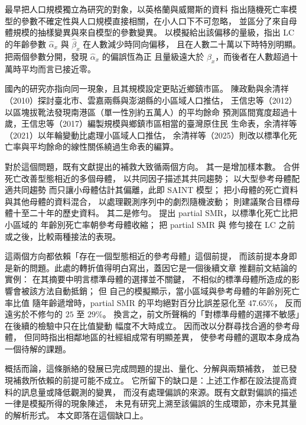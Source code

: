 \documentclass[UTF8, fontset=macnew, a4paper, 12pt]{ctexart}
\begin{document}
\citet{chen2017} 最早把人口規模獨立為研究的對象，以英格蘭與威爾斯的資料
指出隨機死亡率模型的參數不確定性與人口規模直接相關，在小人口下不可忽略，
並區分了來自母體規模的抽樣變異與來自模型的參數變異。
\citet{wang2018} 以模擬給出該偏移的量級，指出 LC 的年齡參數
$\hat\alpha_x$ 與 $\hat\beta_x$ 在人數減少時同向偏移，
且在人數二十萬以下時特別明顯。
\citet[Figure 1]{yue2019} 把兩個參數分開，發現 $\hat\alpha_x$ 的偏誤恆為正
且量級遠大於 $\hat\beta_x$，而後者在人數超過十萬時平均而言已接近零。

國內的研究亦指向同一現象，且其規模設定更貼近鄉鎮市區。
陳政勳與余清祥（2010）探討臺北市、雲嘉兩縣與澎湖縣的小區域人口推估，
王信忠等（2012）以區塊拔靴法發現南港區（單一性別約五萬人）的平均餘命
預測區間寬度超過十歲，王信忠等（2017）編製規模與鄉鎮市區相當的臺灣原住民
生命表，余清祥等（2021）以年輪變動比處理小區域人口推估，
余清祥等（2025）則改以標準化死亡率與平均餘命的線性關係繞過生命表的編算。

對於這個問題，既有文獻提出的補救大致循兩個方向。
其一是增加樣本數。\citet{lilee2005} 合併死亡改善型態相近的多個母體，
以共同因子描述其共同趨勢；\citet{jarner2011} 以大型參考母體配適共同趨勢
而只讓小母體估計其偏離，此即 SAINT 模型；
\citet{ahcan2014} 把小母體的死亡資料與其他母體的資料混合，
以處理觀測序列中的劇烈隨機波動；
\citet{wang2018} 則建議聚合目標母體十至二十年的歷史資料。
其二是修勻。\citet{lee2003} 提出 partial SMR，以標準化死亡比把小區域的
年齡別死亡率朝參考母體收縮；\citet{yue2019} 把 partial SMR 與
\citet{whittaker1923} 修勻接在 LC 之前或之後，比較兩種接法的表現。

這兩個方向都依賴「存在一個型態相近的參考母體」這個前提，
而該前提本身即是新的問題。此處的轉折值得明白寫出，蓋因它是一個後續文章
推翻前文結論的實例：\citet{lee2003} 在其摘要中明言標準母體的選擇並不關鍵，
不相似的標準母體所造成的影響會被該方法自動抵銷；
但 \citet{yue2019} 自己的模擬顯示，當小區域與參考母體的年齡別死亡率比值
隨年齡遞增時，partial SMR 的平均絕對百分比誤差惡化至 $47.65\%$，
反而遠劣於不修勻的 $25$ 至 $29\%$。
換言之，前文所聲稱的「對標準母體的選擇不敏感」在後續的檢驗中只在比值變動
幅度不大時成立。
\citet{wangyue2026} 因而改以分群尋找合適的參考母體，
但同時指出相鄰地區的社經組成常有明顯差異，
使參考母體的選取本身成為一個待解的課題。

概括而論，這條脈絡的發展已完成問題的提出、量化、分解與兩類補救，
並已發現補救所依賴的前提可能不成立。
它所留下的缺口是：上述工作都在設法提高資料的訊息量或降低觀測的變異，
而沒有處理偏誤的來源。既有文獻對偏誤的描述一律是模擬所得的現象陳述，
未見有研究上溯至該偏誤的生成環節，亦未見其量的解析形式。
本文即落在這個缺口上。
\end{document}
